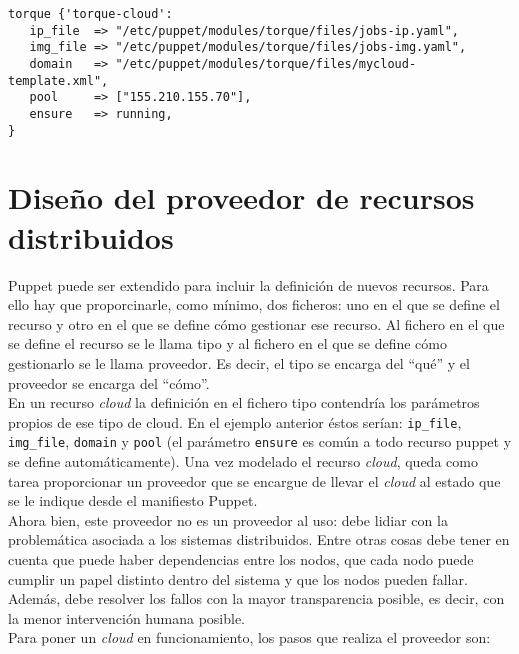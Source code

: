 \begin{lstlisting}
torque {'torque-cloud':
   ip_file  => "/etc/puppet/modules/torque/files/jobs-ip.yaml",
   img_file => "/etc/puppet/modules/torque/files/jobs-img.yaml",
   domain   => "/etc/puppet/modules/torque/files/mycloud-template.xml",
   pool     => ["155.210.155.70"],
   ensure   => running,
}
\end{lstlisting}


\section{Diseño del proveedor de recursos distribuidos}

Puppet puede ser extendido para incluir la definición de nuevos recursos. Para ello hay que proporcinarle, como mínimo, dos ficheros: uno en el que se define el recurso y otro en el que se define cómo gestionar ese recurso. Al fichero en el que se define el recurso se le llama tipo y al fichero en el que se define cómo gestionarlo se le llama proveedor. Es decir, el tipo se encarga del ``qué'' y el proveedor se encarga del ``cómo''.\\

En un recurso \emph{cloud} la definición en el fichero tipo contendría los parámetros propios de ese tipo de cloud. En el ejemplo anterior éstos serían: \texttt{ip\_file}, \texttt{img\_file}, \texttt{domain} y \texttt{pool} (el parámetro \texttt{ensure} es común a todo recurso puppet y se define automáticamente). Una vez modelado el recurso \emph{cloud}, queda como tarea proporcionar un proveedor que se encargue de llevar el \emph{cloud} al estado que se le indique desde el manifiesto Puppet.\\

Ahora bien, este proveedor no es un proveedor al uso: debe lidiar con la problemática asociada a los sistemas distribuidos. Entre otras cosas debe tener en cuenta que puede haber dependencias entre los nodos, que cada nodo puede cumplir un papel distinto dentro del sistema y que los nodos pueden fallar. Además, debe resolver los fallos con la mayor transparencia posible, es decir, con la menor intervención humana posible.\\

Para poner un \emph{cloud} en funcionamiento, los pasos que realiza el proveedor son:


